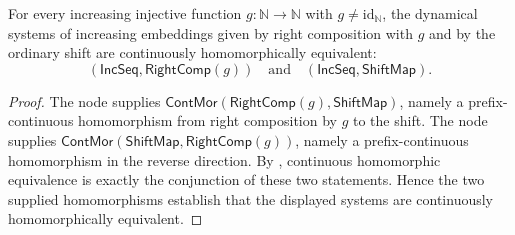 \begin{theorem}[MainProp]
For every increasing injective function $g:\mathbb N\to\mathbb N$ with
$g\neq\mathrm{id}_{\mathbb N}$, the dynamical systems of increasing
embeddings given by right composition with $g$ and by the ordinary shift
are continuously homomorphically equivalent:
\[
(\mathsf{IncSeq},\mathsf{RightComp}(g))
\quad\text{and}\quad
(\mathsf{IncSeq},\mathsf{ShiftMap}).
\]
\end{theorem}
\begin{proof}
The node  supplies
\(\mathsf{ContMor}(\mathsf{RightComp}(g),\mathsf{ShiftMap})\), namely a
prefix-continuous homomorphism from right composition by $g$ to the shift.
The node  supplies
\(\mathsf{ContMor}(\mathsf{ShiftMap},\mathsf{RightComp}(g))\), namely a
prefix-continuous homomorphism in the reverse direction.  By
, continuous homomorphic equivalence is exactly the
conjunction of these two statements.  Hence the two supplied homomorphisms
establish that the displayed systems are continuously homomorphically
equivalent.
\end{proof}
